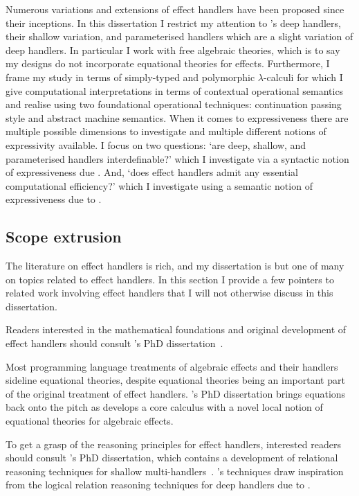 \documentclass[12pt,phd,lfcs,twoside,openright,logo,leftchapter,normalheadings]{infthesis}
\theoremstyle{plain}
\theoremstyle{definition}
\begin{document}
Numerous variations and extensions of effect handlers have been
proposed since their inceptions.  In this dissertation I restrict my
attention to \citeauthor{PlotkinP09}'s deep handlers, their shallow
variation, and parameterised handlers which are a slight variation of
deep handlers. In particular I work with free algebraic theories,
which is to say my designs do not incorporate equational theories for
effects. Furthermore, I frame my study in terms of simply-typed and
polymorphic $\lambda$-calculi for which I give computational
interpretations in terms of contextual operational semantics and
realise using two foundational operational techniques: continuation
passing style and abstract machine semantics. When it comes to
expressiveness there are multiple possible dimensions to investigate
and multiple different notions of expressivity available. I focus on
two questions: `are deep, shallow, and parameterised handlers
interdefinable?' which I investigate via a syntactic notion of
expressiveness due \citet{Felleisen91}. And, `does effect handlers
admit any essential computational efficiency?' which I investigate
using a semantic notion of expressiveness due to \citet{LongleyN15}.

\subsection{Scope extrusion}
The literature on effect handlers is rich, and my dissertation is but
one of many on topics related to effect handlers. In this section I
provide a few pointers to related work involving effect handlers that
I will not otherwise discuss in this dissertation.

Readers interested in the mathematical foundations and original
development of effect handlers should consult \citeauthor{Pretnar10}'s
PhD dissertation~\cite{Pretnar10}.

Most programming language treatments of algebraic effects and their
handlers sideline equational theories, despite equational theories
being an important part of the original treatment of effect
handlers. \citeauthor{Ziga20}'s PhD dissertation brings equations back
onto the pitch as \citet{Ziga20} develops a core calculus with a novel
local notion of equational theories for algebraic effects.

To get a grasp of the reasoning principles for effect handlers,
interested readers should consult \citeauthor{McLaughlin20}'s PhD
dissertation, which contains a development of relational reasoning
techniques for shallow
multi-handlers~\cite{McLaughlin20}. \citeauthor{McLaughlin20}'s
techniques draw inspiration from the logical relation reasoning
techniques for deep handlers due to \citet{BiernackiPPS18}.
\end{document}
